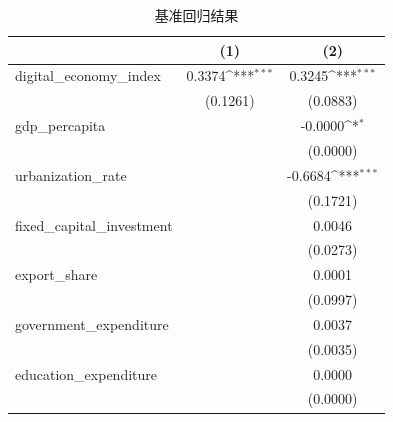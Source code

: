 \begin{table}[htbp]
\centering
\caption{基准回归结果}
\label{tab:main}
\def\sym#1{\ifmmode^{#1}\else\(^{#1}\)\fi}
\begin{tabular}{lcc}
\toprule
 & (1) & (2) \\
\midrule
digital\_economy\_index & 0.3374\sym{***} & 0.3245\sym{***} \\
  & (0.1261) & (0.0883) \\
gdp\_percapita &  & -0.0000\sym{*} \\
  &  & (0.0000) \\
urbanization\_rate &  & -0.6684\sym{***} \\
  &  & (0.1721) \xed\_capital\_investment &  & 0.0046 \\
  &  & (0.0273) \\
export\_share &  & 0.0001 \\
  &  & (0.0997) \\
government\_expenditure &  & 0.0037 \\
  &  & (0.0035) \\
education\_expenditure &  & 0.0000 \\
  &  & (0.0000) \\
\bottomrule
\end{tabular}
\end{table}
